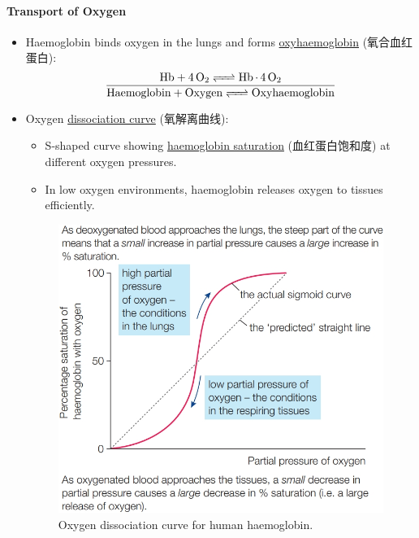 \paragraph{Transport of Oxygen}
\begin{itemize}
    \item Haemoglobin binds oxygen in the lungs and forms \underline{oxyhaemoglobin} (氧合血红蛋白):
    \begin{equation}
        \frac{\ce{Hb + 4O2 <=> Hb.4O2}}{\ce{Haemoglobin + Oxygen <=> Oxyhaemoglobin}}
    \end{equation}
    \item Oxygen \underline{dissociation curve} (氧解离曲线):
    \begin{itemize}
        \item S-shaped curve showing \underline{haemoglobin saturation} (血红蛋白饱和度) at different oxygen pressures.
        \item In low oxygen environments, haemoglobin releases oxygen to tissues efficiently.
    \end{itemize}
    \begin{figure}[H]
        \centering
        \includegraphics[scale=0.25]{Biology/1B/Images/1B-2-2.png}
        \caption{Oxygen dissociation curve for human haemoglobin.}
    \end{figure}
\end{itemize}

